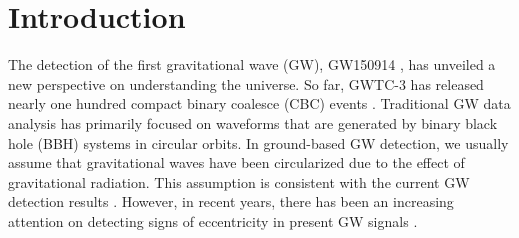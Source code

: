 \documentclass[
reprint,
superscriptaddress,
amsmath,amssymb,
aps,
prd,
floatfix,
]{revtex4-2}
\begin{document}
\section{Introduction}
The detection of the first gravitational wave (GW), GW150914 \cite{Abbott2016, abbottBinaryBlackHole2016, abbottGW150914FirstResults2016}, has unveiled a new perspective on understanding the universe.
So far, GWTC-3 has released nearly one hundred compact binary coalesce (CBC) events \cite{abbottGWTC1GravitationalWaveTransient2019, abbottGWTC2CompactBinary2021, abbottGWTC3CompactBinary2023a}. 
Traditional GW data analysis has primarily focused on waveforms that are generated by binary black hole (BBH) systems in circular orbits. 
In ground-based GW detection, we usually assume that gravitational waves have been circularized due to the effect of gravitational radiation. This assumption is consistent with the current GW detection results \cite{ abbottGWTC1GravitationalWaveTransient2019, abbottGWTC2CompactBinary2021,abbottGWTC3CompactBinary2023a}. 
However, in recent years, there has been an increasing attention on detecting signs of eccentricity in present GW signals \cite{lowerMeasuringEccentricityBinary2018, abbottSearchEccentricBinary2019, romero-shawSearchingEccentricitySignatures2019a, nitzSearchEccentricBinary2020, romero-shawSignsEccentricityTwo2021, favataConstrainingOrbitalEccentricity2022a, boninoInferringEccentricityEvolution2023, xuMeasurabilityPrecessionEccentricity2023}.
\end{document}
